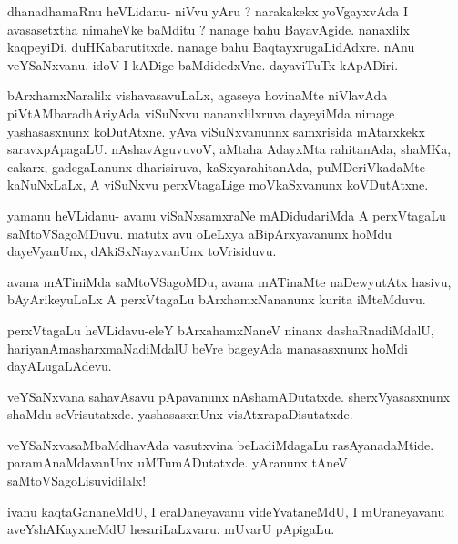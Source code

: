 \documentclass{article}
\begin{document}
\begin{mn}%
dhanadhamaRnu heVLidanu- niVvu yAru ? narakakekx yoVgayxvAda I avasasetxtha nimaheVke 
baMditu ? nanage bahu BayavAgide. nanaxlilx kaqpeyiDi. duHKabarutitxde. nanage bahu 
BaqtayxrugaLidAdxre. nAnu veYSaNxvanu. idoV I kADige baMdidedxVne. dayaviTuTx kApADiri.
\end{mn}

\begin{mn}%
bArxhamxNaralilx vishavasavuLaLx, agaseya hovinaMte niVlavAda piVtAMbaradhAriyAda viSuNxvu 
nananxlilxruva dayeyiMda nimage yashasasxnunx  koDutAtxne. yAva viSuNxvanunnx samxrisida 
mAtarxkekx saravxpApagaLU. nAshavAguvuvoV, aMtaha AdayxMta rahitanAda, shaMKa, cakarx, 
gadegaLanunx dharisiruva,  kaSxyarahitanAda, puMDeriVkadaMte kaNuNxLaLx, A viSuNxvu 
perxVtagaLige moVkaSxvanunx koVDutAtxne.
\end{mn}

\begin{mn}%
yamanu heVLidanu- avanu viSaNxsamxraNe mADidudariMda A perxVtagaLu saMtoVSagoMDuvu. matutx 
avu oLeLxya aBipArxyavanunx hoMdu dayeVyanUnx, dAkiSxNayxvanUnx toVrisiduvu.
\end{mn}

\begin{mn}%
avana mATiniMda saMtoVSagoMDu, avana mATinaMte naDewyutAtx hasivu, bAyArikeyuLaLx A 
perxVtagaLu bArxhamxNananunx kurita iMteMduvu.
\end{mn}
\begin{mn}%
perxVtagaLu heVLidavu-eleY bArxahamxNaneV ninanx dashaRnadiMdalU, 
hariyanAmasharxmaNadiMdalU beVre bageyAda manasasxnunx hoMdi dayALugaLAdevu.
\end{mn}

\begin{mn}%
veYSaNxvana sahavAsavu pApavanunx nAshamADutatxde. sherxVyasasxnunx shaMdu seVrisutatxde. 
yashasasxnUnx visAtxrapaDisutatxde.
\end{mn}

\begin{mn}%
veYSaNxvasaMbaMdhavAda vasutxvina beLadiMdagaLu rasAyanadaMtide.  paramAnaMdavanUnx 
uMTumADutatxde. yAranunx tAneV saMtoVSagoLisuvidilalx!
\end{mn}

\begin{mn}%
ivanu kaqtaGananeMdU, I eraDaneyavanu videYvataneMdU, I mUraneyavanu aveYshAKayxneMdU 
hesariLaLxvaru. mUvarU pApigaLu. 
\end{mn}
\end{document}
